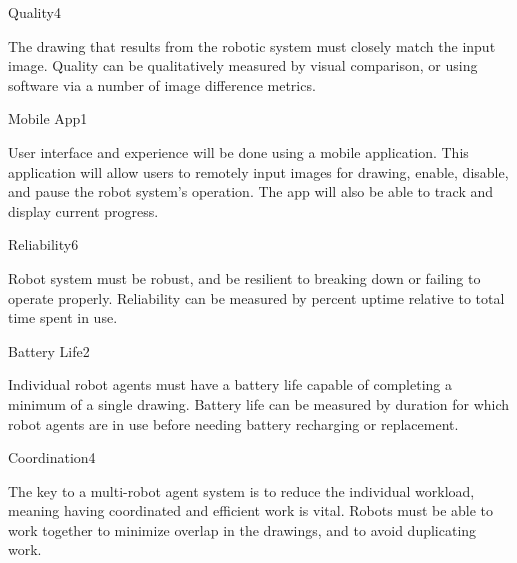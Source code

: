 \begin{nonfunctional_requirement}{Quality}{4}
\item The drawing that results from the robotic system must closely match the input image. Quality can be qualitatively measured by visual comparison, or using software via a number of image difference metrics.
\end{nonfunctional_requirement}

\begin{nonfunctional_requirement}{Mobile App}{1}
\item User interface and experience will be done using a mobile application. This application will allow users to remotely input images for drawing, enable, disable, and pause the robot system's operation. The app will also be able to track and display current progress.
\end{nonfunctional_requirement}

\begin{nonfunctional_requirement}{Reliability}{6}
\item Robot system must be robust, and be resilient to breaking down or failing to operate properly. Reliability can be measured by percent uptime relative to total time spent in use.
\end{nonfunctional_requirement}

\begin{nonfunctional_requirement}{Battery Life}{2}
\item Individual robot agents must have a battery life capable of completing a minimum of a single drawing. Battery life can be measured by duration for which robot agents are in use before needing battery recharging or replacement.
\end{nonfunctional_requirement}

\begin{nonfunctional_requirement}{Coordination}{4}
\item The key to a multi-robot agent system is to reduce the individual workload, meaning having coordinated and efficient work is vital. Robots must be able to work together to minimize overlap in the drawings, and to avoid duplicating work.
\end{nonfunctional_requirement}

\begin{comment}
\end{comment}
